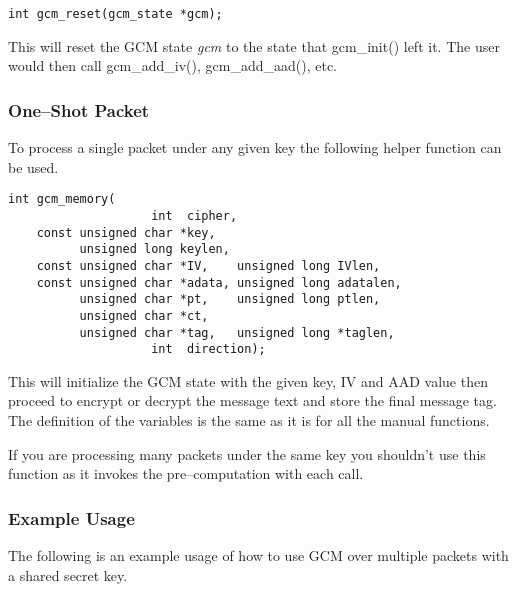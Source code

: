 \documentclass[synpaper]{book}
\begin{document}
\begin{verbatim}
int gcm_reset(gcm_state *gcm);
\end{verbatim}

This will reset the GCM state \textit{gcm} to the state that gcm\_init() left it.  The user would then call gcm\_add\_iv(), gcm\_add\_aad(), etc.

\subsubsection{One--Shot Packet}
To process a single packet under any given key the following helper function can be used.

\begin{verbatim}
int gcm_memory(      
                    int  cipher,
    const unsigned char *key,    
          unsigned long keylen,
    const unsigned char *IV,    unsigned long IVlen,
    const unsigned char *adata, unsigned long adatalen,
          unsigned char *pt,    unsigned long ptlen,
          unsigned char *ct, 
          unsigned char *tag,   unsigned long *taglen,
                    int  direction);
\end{verbatim}

This will initialize the GCM state with the given key, IV and AAD value then proceed to encrypt or decrypt the message text and store the final
message tag.  The definition of the variables is the same as it is for all the manual functions.

If you are processing many packets under the same key you shouldn't use this function as it invokes the pre--computation with each call.

\subsubsection{Example Usage}
The following is an example usage of how to use GCM over multiple packets with a shared secret key.
\end{document}
